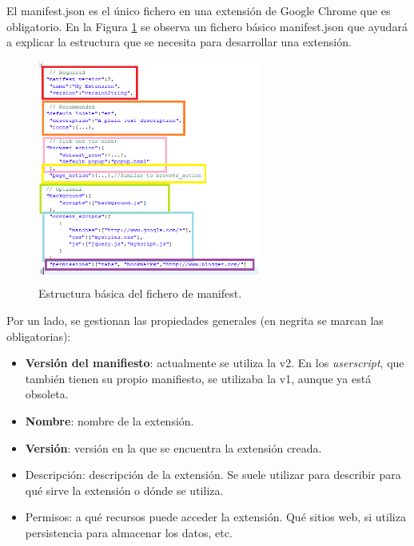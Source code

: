 El manifest.json es el único fichero en una extensión de Google Chrome que es obligatorio. En la Figura \ref{fig:chromeManifest} se observa un fichero básico manifest.json que ayudará a explicar la estructura que se necesita para desarrollar una extensión.

\begin{figure}
\begin{center}
\includegraphics[width=0.65\textwidth]{figs/5-Manifest.png}
\caption{Estructura básica del fichero de manifest.}
\label{fig:chromeManifest}
\end{center}
\end{figure}

Por un lado, se gestionan las propiedades generales (en negrita se marcan las obligatorias):
\begin{itemize}
\item{\textbf{Versión del manifiesto}: actualmente se utiliza la v2. En los \emph{userscript}, que también tienen su propio manifiesto, se utilizaba la v1, aunque ya está obsoleta.}
\item{\textbf{Nombre}: nombre de la extensión.}
\item{\textbf{Versión}: versión en la que se encuentra la extensión creada.}
\item{Descripción: descripción de la extensión. Se suele utilizar para describir para qué sirve la extensión o dónde se utiliza.}
\item{Permisos: a qué recursos puede acceder la extensión. Qué sitios web, si utiliza persistencia para almacenar los datos, etc.}
\end{itemize}

